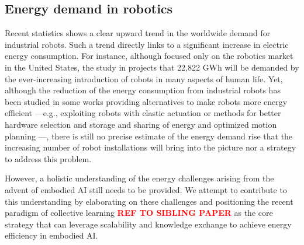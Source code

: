 \subsection{Energy demand in robotics}\label{sec:energy_in_robotics}
Recent statistics \cite{IFR2019} shows a clear upward trend in the worldwide demand for industrial robots. Such a trend directly links to a significant increase in electric energy consumption. For instance, although focused only on the robotics market in the United States, the study in \cite{barnett_2017} projects that 22,822 GWh will be demanded by the ever-increasing introduction of robots in many aspects of human life. Yet, although the reduction of the energy consumption from industrial robots has been studied in some works \cite{schroder2014, chalmers2015, mohammed2014, chemnitz2011} providing alternatives to make robots more energy efficient ---e.g., exploiting robots with elastic actuation \cite{scalera2019natural, carabin2017review, bolivar2017general, haddadin2011optimal,haddadin2012intrinsically} or methods for better hardware selection and storage and sharing of energy and optimized motion planning \cite{carabin2017review}---,  there is still no precise estimate of the energy demand rise that the increasing number of robot installations will bring into the picture nor a strategy to address this problem.

However, a holistic understanding of the energy challenges arising from the advent of embodied AI still needs to be provided. We attempt to contribute to this understanding by elaborating on these challenges and positioning the recent paradigm of collective learning \textbf{\textcolor{red}{REF TO SIBLING PAPER}} as the core strategy that can leverage scalability and knowledge exchange to achieve energy efficiency in embodied AI.
